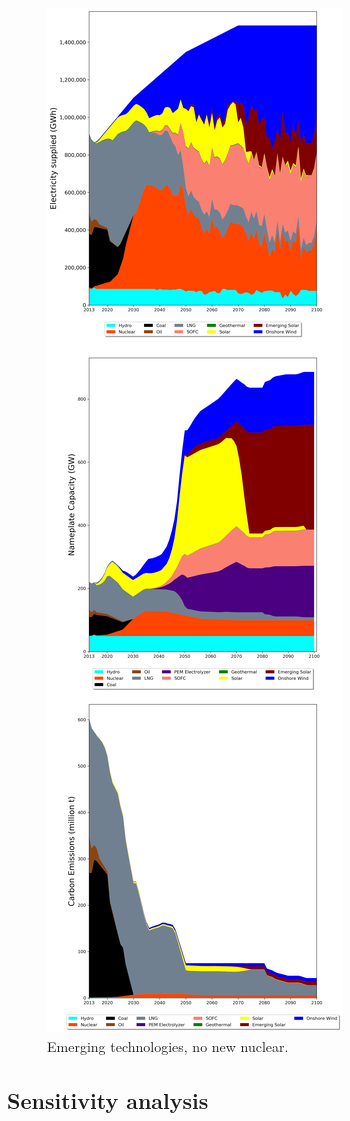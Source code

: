 \begin{figure}[h] 
\centering
\label{scen4}
\includegraphics[scale=0.3]{figures/newtechs_nuc}
\caption{Emerging technologies, no new nuclear.}
\end{figure}

\subsection{Sensitivity analysis}